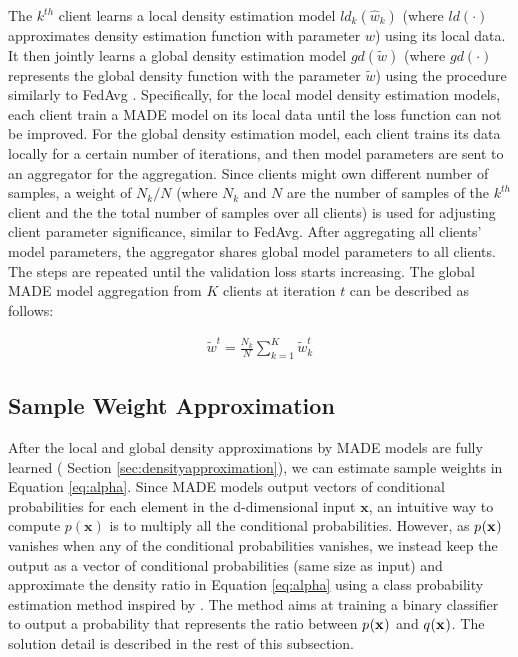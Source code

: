 The $k^{th}$ client learns a local density estimation model $ld_k(\hat{w}_k)$ (where $ld(\cdot)$ approximates density estimation function with parameter $\hat{w}$) using its local data. It then jointly learns a global density estimation model $gd(\tilde{w})$ (where $gd(\cdot)$ represents the global density function with the parameter $\tilde{w}$) using the procedure similarly to FedAvg \cite{OriginFL}. Specifically, for the local model density estimation models, each client train a MADE model on its local data until the loss function can not be improved. For the global density estimation model, each client trains its data locally for a certain number of iterations, and then model parameters are sent to an aggregator for the aggregation. Since clients might own different number of samples, a weight of ${N_k}/N$ (where $N_k$ and $N$ are the number of samples of the $k^{th}$ client and the the total number of samples over all clients) is used for adjusting client parameter significance, similar to FedAvg. After aggregating all clients' model parameters, the aggregator shares global model parameters to all clients. The steps are repeated until the validation loss starts increasing. The global MADE model aggregation from $K$ clients at iteration $t$ can be described as follows:

\begin{equation}
\begin{aligned}
\tilde{w}^t = \frac{N_k}{N}\sum_{k=1}^{K} \tilde{w}^t_k 
\end{aligned}
\end{equation}

\subsection{Sample Weight Approximation}
\label{sec:weightapproximation}
After the local and global density approximations by MADE models are fully learned ( Section \ref{sec:densityapproximation}), we can estimate sample weights in Equation \ref{eq:alpha}. Since MADE models output vectors of conditional probabilities for each element in the d-dimensional input $\mathbf{x}$, an intuitive way to compute $p(\mathbf{x})$ is to multiply all the conditional probabilities. However, as $p_{}(\mathbf{x_{}})$ vanishes when any of the conditional probabilities vanishes, we instead keep the output as a vector of conditional probabilities (same size as input) and approximate the density ratio in Equation \ref{eq:alpha} using a class probability estimation method inspired by \cite{densityratio}. The method aims at training a binary classifier to output a probability that represents the ratio between $p_{}(\mathbf{x_{}})$ and $q_{}(\mathbf{x_{}})$. The solution detail is described in the rest of this subsection. 

